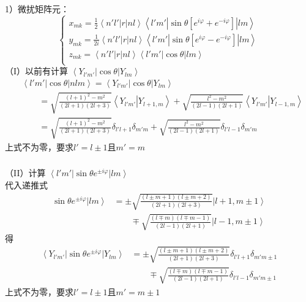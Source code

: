 \begin{frame} 
  \frametitle{}
1）微扰矩阵元：
$$\left\{\begin{aligned}
  x_{mk}=  \frac{1}{2 }\left\langle n'l' \left\vert r \right\vert nl \right\rangle \left\langle l'm' \left\vert \sin \theta [e^{i\varphi} + e^{-i\varphi}] \right\vert lm \right\rangle  \\
  y_{mk}=  \frac{1}{2i }\left\langle n'l' \left\vert r \right\vert nl \right\rangle \left\langle l'm' \left\vert \sin \theta [e^{i\varphi} - e^{-i\varphi}] \right\vert lm \right\rangle  \\
  z_{mk}=  \left\langle n'l' \left\vert r \right\vert nl \right\rangle \left\langle l'm' \left\vert \cos \theta \right\vert lm \right\rangle \\
\end{aligned} \right. $$ 
（I）以前有计算 $\left\langle  Y_{l'm'} \right\vert \cos\theta \left\vert Y_{lm} \right\rangle$
$$
\begin{aligned}
 & \left\langle l'm' \left\vert \cos \theta \right\vert nlm \right\rangle = \left\langle  Y_{l'm'} \right\vert \cos\theta \left\vert Y_{lm} \right\rangle  \\
  & \qquad = \sqrt{\frac{(l+1)^2-m^2}{(2l+1)(2l+3)}}\left\langle Y_{l'm'} \left\vert Y_{l+1,m} \right\rangle \right. + \sqrt{\frac{l^2-m^2}{(2l-1)(2l+1)}} \left\langle Y_{l'm'} \left\vert Y_{l-1,m} \right\rangle \right. \\
  &\qquad = \sqrt{\frac{(l+1)^2-m^2}{(2l+1)(2l+3)}} \delta _{l'l+1} \delta _{m'm} + \sqrt{\frac{l^2-m^2}{(2l-1)(2l+1)}} \delta _{l'l-1}\delta _{m'm} 
\end{aligned}
$$ 
上式不为零，要求$l'=l\pm 1$且$m'=m$
\end{frame} 

\begin{frame} 
  \frametitle{}
  （II）计算 $\left\langle  l'm' \right\vert \sin\theta e^{\pm i\varphi}\left\vert lm \right\rangle$ \\
代入递推式
\[ \begin{aligned} \sin\theta e^{\pm i\varphi}\left\vert lm \right\rangle
&= \pm \sqrt{\frac{(l\pm m+1)(l\pm m+2)}{(2l+1)(2l+3)}} \left\vert l+1,m \pm 1 \right\rangle  \\
& \hspace{2em} \mp \sqrt{\frac{(l\mp m)(l\mp m -1)}{(2l-1)(2l+1)}} \left \vert  l-1,m\pm 1 \right\rangle 
\end{aligned}
\]
得
\[ \begin{aligned} \left\langle  Y_{l'm'} \right\vert \sin\theta e^{\pm i\varphi}\left\vert Y_{lm} \right\rangle 
  &= \pm \sqrt{\frac{(l\pm m+1)(l\pm m+2)}{(2l+1)(2l+3)}} \delta _{l'l+1} \delta _{m'm\pm 1}  \\
  & \hspace{2em} \mp \sqrt{\frac{(l\mp m)(l\mp m -1)}{(2l-1)(2l+1)}} \delta _{l'l-1} \delta _{m'm\pm 1} 
  \end{aligned}
  \]
  上式不为零，要求$l'=l\pm 1$且$m'=m\pm 1$
\end{frame} 

